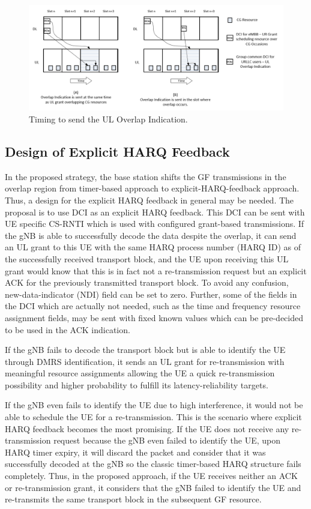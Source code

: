\documentclass[conference]{IEEEtran}
\begin{document}
\begin{figure}[htbp]
\centerline{\includegraphics[scale=0.2]{fig4.png}}
\caption{Timing to send the UL Overlap Indication.}
\label{fig4}
\end{figure}

\subsection{Design of Explicit HARQ Feedback}\label{IIDD}
In the proposed strategy, the base station shifts the GF transmissions in the overlap region from timer-based approach to explicit-HARQ-feedback approach. Thus, a design for the explicit HARQ feedback in general may be needed. The proposal is to use DCI as an explicit HARQ feedback. This DCI can be sent with UE specific CS-RNTI which is used with configured grant-based transmissions. If the gNB is able to successfully decode the data despite the overlap, it can send an UL grant to this UE with the same HARQ process number (HARQ ID) as of the successfully received transport block, and the UE upon receiving this UL grant would know that this is in fact not a re-transmission request but an explicit ACK for the previously transmitted transport block. To avoid any confusion, new-data-indicator (NDI) field can be set to zero. Further, some of the fields in the DCI which are actually not needed, such as the time and frequency resource assignment fields, may be sent with fixed known values which can be pre-decided to be used in the ACK indication.

If the gNB fails to decode the transport block but is able to identify the UE through DMRS identification, it sends an UL grant for re-transmission with meaningful resource assignments allowing the UE a quick re-transmission possibility and higher probability to fulfill its latency-reliability targets.

If the gNB even fails to identify the UE due to high interference, it would not be able to schedule the UE for a re-transmission. This is the scenario where explicit HARQ feedback becomes the most promising. If the UE does not receive any re-transmission request because the gNB even failed to identify the UE, upon HARQ timer expiry, it will discard the packet and consider that it was successfully decoded at the gNB so the classic timer-based HARQ structure fails completely. Thus, in the proposed approach, if the UE receives neither an ACK or re-transmission grant, it considers that the gNB failed to identify the UE and re-transmits the same transport block in the subsequent GF resource.
\end{document}

